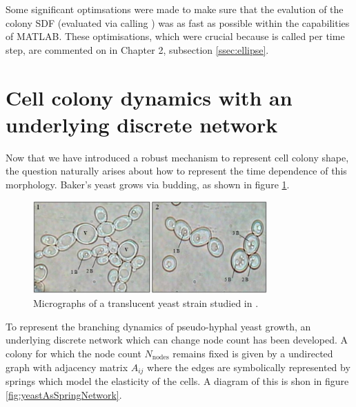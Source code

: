 Some significant optimsations were made to make sure that the evalution of 
the colony SDF (evaluated via calling ) was as fast as 
possible within the capabilities of MATLAB. These 
optimisations, which were crucial because  is called per time step, 
are commented on in Chapter 2, subsection \ref{ssec:ellipse}.

\section{Cell colony dynamics with an underlying discrete network}
Now that we have introduced a robust mechanism to represent cell colony 
shape, the question naturally arises about how to represent the time dependence of this 
morphology. Baker's yeast grows via budding,
as shown in figure \ref{fig:yeastMicrograph}.
\begin{figure}[!htb]
    \centering
    \includegraphics[width=0.8\textwidth]{chapter2/figures/yeastMicrograph.png}
    \caption{Micrographs of a translucent yeast strain studied
             in \cite{ebrahimi2020yeast}.}
    \label{fig:yeastMicrograph}
\end{figure}
To represent the branching dynamics of pseudo-hyphal yeast growth, 
an underlying discrete network which can change node count has been developed.
A colony for which the node count $N_{\textrm{nodes}}$ remains fixed is given 
by a undirected graph with adjacency matrix $A_{ij}$ where the edges are symbolically
represented by springs which model the elasticity of the cells. 
A diagram of this is shon in figure \ref{fig:yeastAsSpringNetwork}. 
